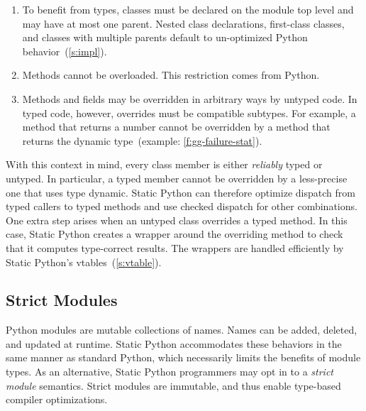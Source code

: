 \documentclass[english,cleveref,submission]{programming}
\newcommand{\SP}{Static Python}
\newcommand{\code}[1]{\texttt{#1}}
\begin{document}
\begin{enumerate}
  \item
    To benefit from types, classes must be declared on the module top level
    and may have at most one parent.
    Nested class declarations, first-class classes, and classes with
    multiple parents default to un-optimized Python behavior~(\cref{s:impl}).

  \item
    Methods cannot be overloaded.
    This restriction comes from Python.

  \item
    Methods and fields may be overridden in arbitrary ways by untyped code.
    In typed code, however, overrides must be compatible subtypes.
    For example, a method that returns a number cannot be overridden by a method
    that returns the dynamic type~(example: \cref{f:gg-failure-stat}).


\end{enumerate}
%
With this context in mind, every class member is either \emph{reliably} typed or untyped.
In particular, a typed member cannot be overridden by a less-precise one that uses
type dynamic.
\SP{} can therefore optimize dispatch from typed callers to typed methods
and use checked dispatch for other combinations.
One extra step arises when an untyped class overrides a typed method.
In this case, \SP{} creates a wrapper around the overriding method to check
that it computes type-correct results.
The wrappers are handled efficiently by \SP{}'s vtables~(\cref{s:vtable}).


\subsection{Strict Modules}
\label{s:strict-mod}


Python modules are mutable collections of names.
Names can be added, deleted, and updated at runtime.
\SP{} accommodates these behaviors in the same manner as standard Python, which
necessarily limits the benefits of module types.
As an alternative, \SP{} programmers may opt in to a \emph{strict module} semantics.
Strict modules are immutable, and thus enable type-based compiler optimizations.
\end{document}
